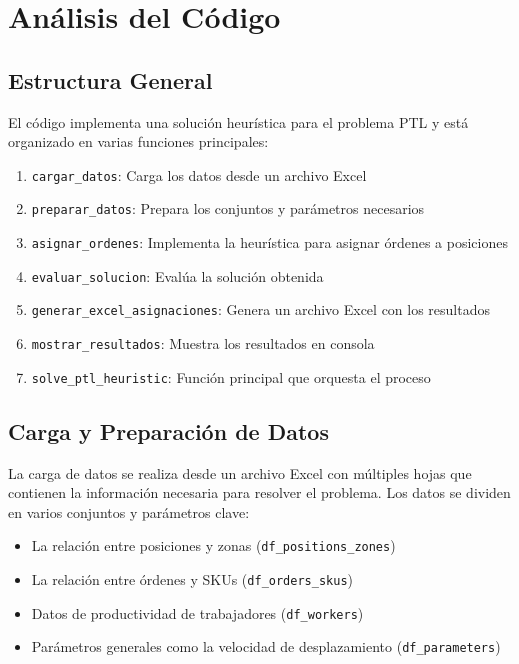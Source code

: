 \documentclass{hw-template}
\begin{document}
\section{Análisis del Código}

\subsection{Estructura General}

El código implementa una solución heurística para el problema PTL y está organizado en varias funciones principales:

\begin{enumerate}
    \item \texttt{cargar\_datos}: Carga los datos desde un archivo Excel
    \item \texttt{preparar\_datos}: Prepara los conjuntos y parámetros necesarios
    \item \texttt{asignar\_ordenes}: Implementa la heurística para asignar órdenes a posiciones
    \item \texttt{evaluar\_solucion}: Evalúa la solución obtenida
    \item \texttt{generar\_excel\_asignaciones}: Genera un archivo Excel con los resultados
    \item \texttt{mostrar\_resultados}: Muestra los resultados en consola
    \item \texttt{solve\_ptl\_heuristic}: Función principal que orquesta el proceso
\end{enumerate}

\subsection{Carga y Preparación de Datos}

La carga de datos se realiza desde un archivo Excel con múltiples hojas que contienen la información necesaria para resolver el problema. Los datos se dividen en varios conjuntos y parámetros clave:
\begin{itemize}
    \item La relación entre posiciones y zonas (\texttt{df\_positions\_zones})
    \item La relación entre órdenes y SKUs (\texttt{df\_orders\_skus})
    \item Datos de productividad de trabajadores (\texttt{df\_workers})
    \item Parámetros generales como la velocidad de desplazamiento (\texttt{df\_parameters})
\end{itemize}
\end{document}
